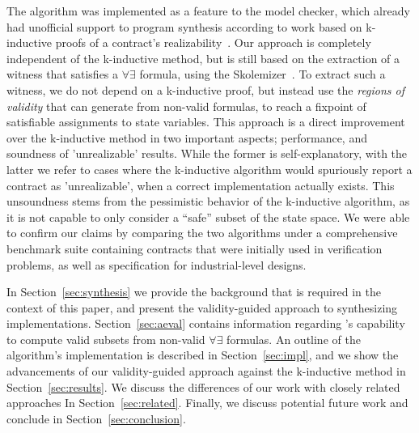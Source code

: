 The algorithm was implemented as a feature to the \jkind model checker, which
already had unofficial support to program synthesis according to work based on
k-inductive proofs of a contract's
realizability~\cite{gacek2015towards,katis2016towards,katis2016synthesis}.
Our approach is completely independent of the k-inductive method, but is still
based on the extraction of a witness that satisfies a $\forall\exists$ formula, using the \aeval Skolemizer~\cite{fedyukovich2015automated}. To extract such a
witness, we do not depend on a k-inductive proof, but instead use the
\textit{regions of validity} that \aeval can generate from non-valid formulas,
to reach a fixpoint of satisfiable assignments to state variables.
This approach is a direct improvement over the k-inductive method in two
important aspects; performance, and soundness of 'unrealizable' results. While
the former is self-explanatory, with the latter we refer to cases where the
k-inductive algorithm would spuriously report a contract as 'unrealizable', when a correct
implementation actually exists. This unsoundness stems from the pessimistic
behavior of the k-inductive algorithm, as it is not capable to only consider a
``safe'' subset of the state space. We were able to confirm our claims
by comparing the two algorithms under a comprehensive benchmark suite containing
contracts that were initially used in verification problems, as well as
specification for industrial-level designs.

In Section~\ref{sec:synthesis} we provide the background that is required in the
context of this paper, and present the validity-guided approach to synthesizing
implementations. Section~\ref{sec:aeval} contains information regarding \aeval's
capability to compute valid subsets from non-valid $\forall\exists$ formulas.
An outline of the algorithm's implementation is described
in Section~\ref{sec:impl}, and we show the advancements of our validity-guided
approach against the k-inductive method in Section~\ref{sec:results}.
We discuss the differences of our work with closely related approaches In
Section~\ref{sec:related}. Finally, we discuss potential future work and
conclude in Section~\ref{sec:conclusion}.

